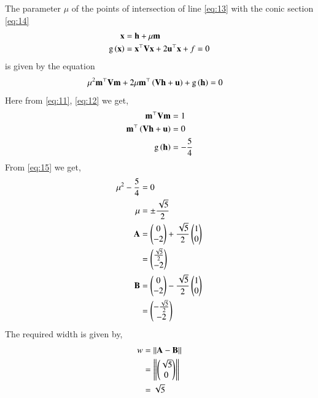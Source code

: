 \documentclass[journal,12pt,twocolumn]{IEEEtran}
\begin{document}
\begin{enumerate}
The parameter $\mu$ of the points of intersection of line \eqref{eq:13} with the conic section \eqref{eq:14}
\begin{align}
\mathbf{x} &= \mathbf{h} + \mu \mathbf{m}
\label{eq:13}\\
\text{g}\left(\mathbf{x}\right) &= \mathbf{x}^{\top}\mathbf{V}\mathbf{x}+2\mathbf{u}^{\top}\mathbf{x}+f=0
\label{eq:14}
\end{align}
is given by the equation 
\begin{align}
\mu^2\mathbf{m}^{\top}\mathbf{V}\mathbf{m} + 2 \mu\mathbf{m}^{\top}\left(\mathbf{V}\mathbf{h}+\mathbf{u}\right) 
	+ \text{g}\left(\mathbf{h}\right) &=0
\label{eq:15}
\end{align}
Here from \eqref{eq:11}, \eqref{eq:12} we get,
\begin{align}
\mathbf{m}^{\top}\mathbf{V}\mathbf{m} & = 1\\
\mathbf{m}^{\top}\left(\mathbf{V}\mathbf{h}+\mathbf{u}\right) &= 0 \\
\text{g}\left(\mathbf{h}\right) &= -\frac{5}{4}
\end{align}
From \eqref{eq:15} we get,
\begin{align}
\mu^2 - \frac{5}{4} &=0\\
\mu &= \pm \frac{\sqrt5}{2}\\
\mathbf{A} &= \begin{pmatrix}0\\-2\end{pmatrix} + \frac{\sqrt5}{2} \begin{pmatrix}1\\0\end{pmatrix}\\
&= \begin{pmatrix}\frac{\sqrt5}{2} \\ -2\end{pmatrix}\\
\mathbf{B} &= \begin{pmatrix}0\\-2\end{pmatrix} - \frac{\sqrt5}{2} \begin{pmatrix}1\\0\end{pmatrix}\\
&= \begin{pmatrix}-\frac{\sqrt5}{2} \\ -2\end{pmatrix}
\end{align}
The required width is given by,
\begin{align}
w &= \left\lVert\mathbf{A} - \mathbf{B}\right\rVert\\
&= \left\lVert\begin{pmatrix}\sqrt{5}\\0\end{pmatrix}\right\rVert\\
&= \sqrt{5}
\end{align}

\begin{table}[h]
\centering

\caption{}
\label{tab:1}
\end{table}

\end{enumerate}
\end{document}
